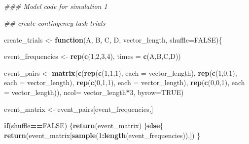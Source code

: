 \documentclass[
  english,
  man,floatsintext]{apa6}
\newenvironment{Shaded}{\begin{snugshade}}{\end{snugshade}}
\newcommand{\KeywordTok}[1]{\textcolor[rgb]{0.13,0.29,0.53}{\textbf{#1}}}
\newcommand{\DataTypeTok}[1]{\textcolor[rgb]{0.13,0.29,0.53}{#1}}
\newcommand{\DecValTok}[1]{\textcolor[rgb]{0.00,0.00,0.81}{#1}}
\newcommand{\StringTok}[1]{\textcolor[rgb]{0.31,0.60,0.02}{#1}}
\newcommand{\CommentTok}[1]{\textcolor[rgb]{0.56,0.35,0.01}{\textit{#1}}}
\newcommand{\OtherTok}[1]{\textcolor[rgb]{0.56,0.35,0.01}{#1}}
\newcommand{\ControlFlowTok}[1]{\textcolor[rgb]{0.13,0.29,0.53}{\textbf{#1}}}
\newcommand{\OperatorTok}[1]{\textcolor[rgb]{0.81,0.36,0.00}{\textbf{#1}}}
\newcommand{\NormalTok}[1]{#1}
\begin{document}
\endgroup


\clearpage
\makeatletter
\efloat@restorefloats
\makeatother


\begin{appendix}
\section{}
\singlespacing

\begin{Shaded}
\begin{Highlighting}[]
\CommentTok{### Model code for simulation 1}

\CommentTok{## create contingency task trials}

\NormalTok{create_trials <-}\StringTok{ }\ControlFlowTok{function}\NormalTok{(A, B, C, D, vector_length, }\DataTypeTok{shuffle=}\OtherTok{FALSE}\NormalTok{)\{}

\NormalTok{  event_frequencies <-}\StringTok{ }\KeywordTok{rep}\NormalTok{(}\KeywordTok{c}\NormalTok{(}\DecValTok{1}\NormalTok{,}\DecValTok{2}\NormalTok{,}\DecValTok{3}\NormalTok{,}\DecValTok{4}\NormalTok{), }\DataTypeTok{times =} \KeywordTok{c}\NormalTok{(A,B,C,D))}

\NormalTok{  event_pairs <-}\StringTok{ }\KeywordTok{matrix}\NormalTok{(}\KeywordTok{c}\NormalTok{(}\KeywordTok{rep}\NormalTok{(}\KeywordTok{c}\NormalTok{(}\DecValTok{1}\NormalTok{,}\DecValTok{1}\NormalTok{,}\DecValTok{1}\NormalTok{), }\DataTypeTok{each =}\NormalTok{ vector_length),}
\KeywordTok{rep}\NormalTok{(}\KeywordTok{c}\NormalTok{(}\DecValTok{1}\NormalTok{,}\DecValTok{0}\NormalTok{,}\DecValTok{1}\NormalTok{), }\DataTypeTok{each =}\NormalTok{ vector_length),}
\KeywordTok{rep}\NormalTok{(}\KeywordTok{c}\NormalTok{(}\DecValTok{0}\NormalTok{,}\DecValTok{1}\NormalTok{,}\DecValTok{1}\NormalTok{), }\DataTypeTok{each =}\NormalTok{ vector_length),}
\KeywordTok{rep}\NormalTok{(}\KeywordTok{c}\NormalTok{(}\DecValTok{0}\NormalTok{,}\DecValTok{0}\NormalTok{,}\DecValTok{1}\NormalTok{), }\DataTypeTok{each =}\NormalTok{ vector_length)),}
\DataTypeTok{ncol=}\NormalTok{ vector_length}\OperatorTok{*}\DecValTok{3}\NormalTok{,}
\DataTypeTok{byrow=}\OtherTok{TRUE}\NormalTok{)}

\NormalTok{  event_matrix <-}\StringTok{ }\NormalTok{event_pairs[event_frequencies,]}

\ControlFlowTok{if}\NormalTok{(shuffle}\OperatorTok{==}\OtherTok{FALSE}\NormalTok{) \{}\KeywordTok{return}\NormalTok{(event_matrix)}
\NormalTok{    \}}\ControlFlowTok{else}\NormalTok{\{}
\KeywordTok{return}\NormalTok{(event_matrix[}\KeywordTok{sample}\NormalTok{(}\DecValTok{1}\OperatorTok{:}\KeywordTok{length}\NormalTok{(event_frequencies)),])}
\NormalTok{    \}}


\end{Highlighting}
\end{Shaded}
\end{appendix}
\end{document}
